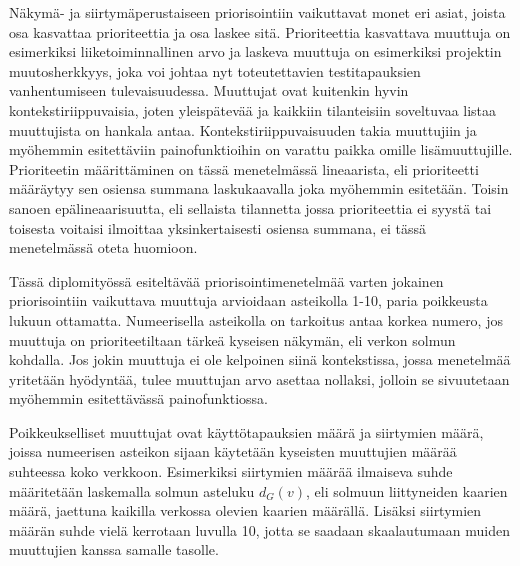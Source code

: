   Näkymä- ja siirtymäperustaiseen priorisointiin vaikuttavat monet eri asiat, joista osa kasvattaa prioriteettia ja osa laskee sitä.
  Prioriteettia kasvattava muuttuja on esimerkiksi liiketoiminnallinen arvo ja laskeva muuttuja on esimerkiksi projektin muutosherkkyys, joka voi johtaa nyt toteutettavien testitapauksien vanhentumiseen tulevaisuudessa.
  Muuttujat ovat kuitenkin hyvin kontekstiriippuvaisia, joten yleispätevää ja kaikkiin tilanteisiin soveltuvaa listaa muuttujista on hankala antaa.
  Kontekstiriippuvaisuuden takia muuttujiin ja myöhemmin esitettäviin painofunktioihin on varattu paikka omille lisämuuttujille.
  Prioriteetin määrittäminen on tässä menetelmässä lineaarista, eli prioriteetti määräytyy sen osiensa summana laskukaavalla joka myöhemmin esitetään.
  Toisin sanoen epälineaarisuutta, eli sellaista tilannetta jossa prioriteettia ei syystä tai toisesta voitaisi ilmoittaa yksinkertaisesti osiensa summana, ei tässä menetelmässä oteta huomioon.

  Tässä diplomityössä esiteltävää priorisointimenetelmää varten jokainen priorisointiin vaikuttava muuttuja arvioidaan asteikolla 1-10, paria poikkeusta lukuun ottamatta.
  Numeerisella asteikolla on tarkoitus antaa korkea numero, jos muuttuja on prioriteetiltaan tärkeä kyseisen näkymän, eli verkon solmun kohdalla.
  Jos jokin muuttuja ei ole kelpoinen siinä kontekstissa, jossa menetelmää yritetään hyödyntää, tulee muuttujan arvo asettaa nollaksi, jolloin se sivuutetaan myöhemmin esitettävässä painofunktiossa.

  Poikkeukselliset muuttujat ovat käyttötapauksien määrä ja siirtymien määrä, joissa numeerisen asteikon sijaan käytetään kyseisten muuttujien määrää suhteessa koko verkkoon.
  Esimerkiksi siirtymien määrää ilmaiseva suhde määritetään laskemalla solmun asteluku \(d_G(v)\), eli solmuun liittyneiden kaarien määrä, jaettuna kaikilla verkossa olevien kaarien määrällä.
  Lisäksi siirtymien määrän suhde vielä kerrotaan luvulla 10, jotta se saadaan skaalautumaan muiden muuttujien kanssa samalle tasolle.

